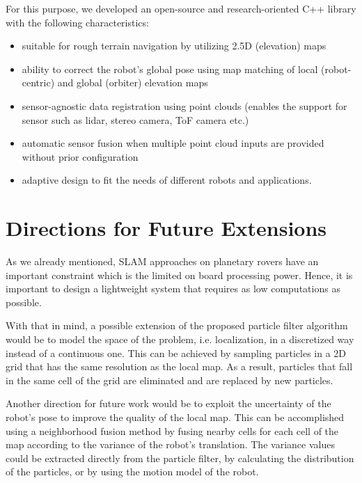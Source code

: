 For this purpose, we developed an open-source and research-oriented
C++ library with the following characteristics:

\begin{itemize}
    \item suitable for rough terrain navigation by utilizing
        2.5D (elevation) maps
    \item ability to correct the robot's global pose using map matching
        of local (robot-centric) and global (orbiter) elevation maps
    \item sensor-agnostic data registration using point clouds
        (enables the support for sensor such as lidar,
        stereo camera, ToF camera etc.)
    \item automatic sensor fusion when multiple point cloud inputs
        are provided without prior configuration
    \item adaptive design to fit the needs of different robots
        and applications.
\end{itemize}

\section{Directions for Future Extensions}

As we already mentioned, SLAM approaches on planetary rovers have an important
constraint which is the limited on board processing power.
Hence, it is important to design a lightweight system that requires as low
computations as possible.

With that in mind, a possible extension of the proposed particle filter
algorithm would be to model the space of the problem, i.e. localization,
in a discretized way instead of a continuous one.
This can be achieved by sampling particles in a 2D grid that has the same
resolution as the local map.
As a result, particles that fall in the same cell of the grid are eliminated
and are replaced by new particles.

Another direction for future work would be to exploit the uncertainty
of the robot's pose to improve the quality of the local map.
This can be accomplished using a neighborhood fusion method
\parencite{Fankhauser2014} by fusing nearby cells for each cell of the
map according to the variance of the robot's translation.
The variance values could be extracted directly from the particle filter,
by calculating the distribution of the particles, or by using the
motion model of the robot.

